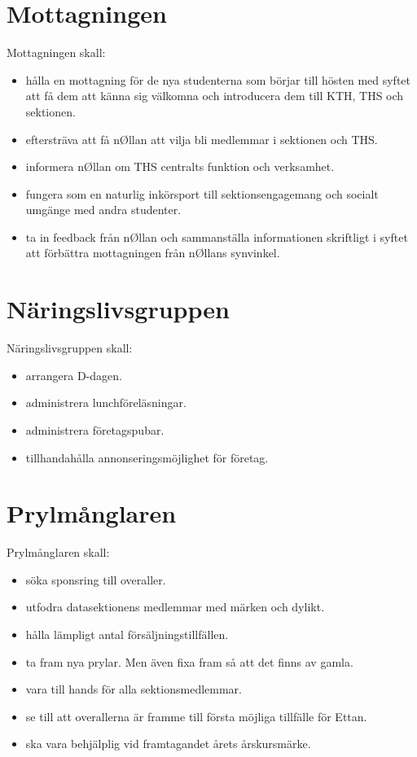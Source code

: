 \documentclass{dgovdoc}
\begin{document}
\section{Mottagningen}
Mottagningen skall:
\begin{itemize}
\item hålla en mottagning för de nya studenterna som börjar till hösten med syftet att få dem att känna sig välkomna och introducera dem till KTH, THS och sektionen.
\item eftersträva att få n\O llan att vilja bli medlemmar i sektionen och THS.
\item informera n\O llan om THS centralts funktion och verksamhet.
\item fungera som en naturlig inkörsport till sektionsengagemang och socialt umgänge med andra studenter.
\item ta in feedback från n\O llan och sammanställa informationen skriftligt i syftet att förbättra mottagningen från n\O llans synvinkel.
\end{itemize}

\section{Näringslivsgruppen} 
Näringslivsgruppen skall:
\begin{itemize}
\item arrangera D-dagen.
\item administrera lunchföreläsningar.
\item administrera företagspubar.
\item tillhandahålla annonseringsmöjlighet för företag.
\end{itemize}

\section{Prylmånglaren} 
Prylmånglaren skall:
\begin{itemize}
\item söka sponsring till overaller.
\item utfodra datasektionens medlemmar med märken och dylikt.
\item hålla lämpligt antal försäljningstillfällen.
\item ta fram nya prylar. Men även fixa fram så att det finns av gamla.
\item vara till hands för alla sektionsmedlemmar.
\item se till att overallerna är framme till första möjliga tillfälle för Ettan.
\item ska vara behjälplig vid framtagandet årets årskursmärke.
\end{itemize}
\end{document}
